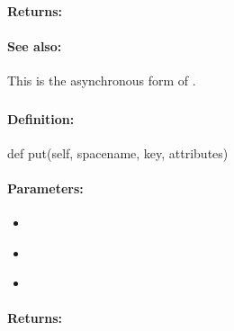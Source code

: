 \paragraph{Returns:}


\paragraph{See also:}  This is the asynchronous form of .

\pagebreak
\subsubsection{}
\label{api:python:put}


\paragraph{Definition:}
\begin{pythoncode}
def put(self, spacename, key, attributes)
\end{pythoncode}

\paragraph{Parameters:}
\begin{itemize}[noitemsep]
\item {}\\

\item {}\\

\item {}\\

\end{itemize}

\paragraph{Returns:}


\pagebreak
\subsubsection{}
\label{api:python:async_put}


